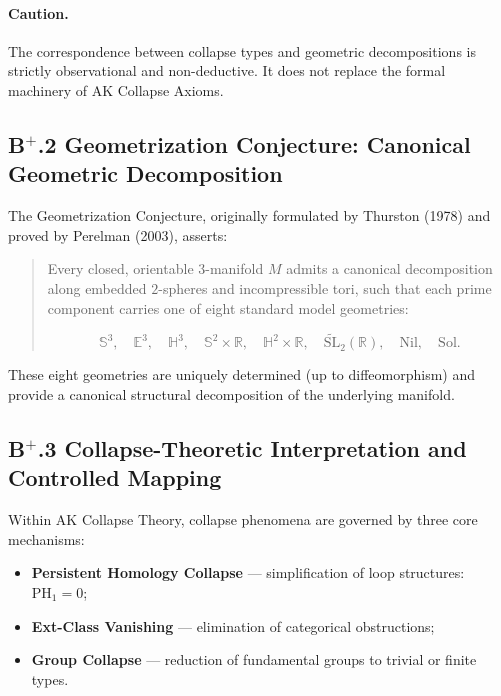 \documentclass[11pt]{article}
\begin{document}
\paragraph{Caution.}  
The correspondence between collapse types and geometric decompositions is strictly observational and non-deductive. It does not replace the formal machinery of AK Collapse Axioms.

\subsection*{B$^{+}$.2 Geometrization Conjecture: Canonical Geometric Decomposition}

The Geometrization Conjecture, originally formulated by Thurston (1978) and proved by Perelman (2003), asserts:

\begin{quote}
Every closed, orientable $3$-manifold $M$ admits a canonical decomposition along embedded $2$-spheres and incompressible tori, such that each prime component carries one of eight standard model geometries:

\[
\mathbb{S}^3,\quad \mathbb{E}^3,\quad \mathbb{H}^3,\quad \mathbb{S}^2 \times \mathbb{R},\quad \mathbb{H}^2 \times \mathbb{R},\quad \widetilde{\mathrm{SL}}_2(\mathbb{R}),\quad \mathrm{Nil},\quad \mathrm{Sol}.
\]
\end{quote}

These eight geometries are uniquely determined (up to diffeomorphism) and provide a canonical structural decomposition of the underlying manifold.

\subsection*{B$^{+}$.3 Collapse-Theoretic Interpretation and Controlled Mapping}

Within AK Collapse Theory, collapse phenomena are governed by three core mechanisms:

\begin{itemize}
    \item \textbf{Persistent Homology Collapse} — simplification of loop structures: $\mathrm{PH}_1 = 0$;
    \item \textbf{Ext-Class Vanishing} — elimination of categorical obstructions;
    \item \textbf{Group Collapse} — reduction of fundamental groups to trivial or finite types.
\end{itemize}
\end{document}
